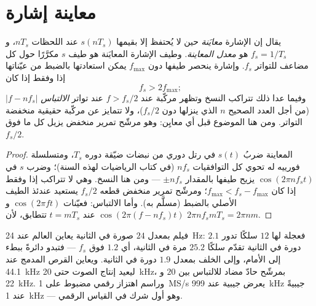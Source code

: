 \section{معاينة إشارة}

\begin{theorem}\label{thm:b2:feedback-oscillators:shannon}
يقال إن الإشارة \emph{معايَنة} حين لا يُحتفظ إلا بقيمها $s(nT_s)$ عند
اللحظات $nT_s$، و $f_s = 1/T_s$ هو \emph{معدل المعاينة}.
وطيف الإشارة المعايَنة هو طيف $s$ مكرَّرًا
حول كل مضاعف للتواتر $f_s$. وإشارة ينحصر طيفها
دون $f_{\max}$ يمكن استعادتها بالضبط من عيّناتها إذا وفقط
إذا كان
\[
f_s > 2f_{\max} ;
\]
وفيما عدا ذلك تتراكب النسخ وتظهر مركّبة عند $f > f_s/2$
عند تواتر \emph{الالتباس} $|f - nf_s|$ (من أجل العدد الصحيح $n$ الذي
ينزلها دون $f_s/2$)، ولا تتمايز عن مركّبة حقيقية منخفضة
التواتر. ومن هنا \emph{} الموضوع قبل أي
معايِن: وهو مرشّح تمرير منخفض يزيل كل ما فوق $f_s/2$.
\end{theorem}

\begin{proof}
المعاينة ضربُ $s(t)$ في رتل دوري من نبضات ضيّقة دوره
$T_s$، ومتسلسلة فورييه له تحوي كل التوافقيات $nf_s$
(في كتاب الرياضيات لهذه السنة)؛ وضرب $s$ في $\cos(2\pi nf_st)$
يزيح طيفها بالمقدار $\pm nf_s$ --- ومن هنا النسخ. وهي لا
تتراكب إذا وفقط إذا كان $f_{\max} < f_s - f_{\max}$؛ ومرشّح تمرير منخفض قطعه $f_s/2$
يستعيد عندئذ الطيف الأصلي بالضبط (مسلَّم به). وأما الالتباس: فعيّنات
$\cos(2\pi ft)$ و $\cos(2\pi(f - nf_s)t)$ عند $t = mT_s$
تتطابق، لأن $2\pi nf_smT_s = 2\pi nm$.
\end{proof}

\begin{example}\label{ex:b2:feedback-oscillators:alias}
فيلم بمعدل $24$ صورة في الثانية يعاين العالم عند \qty{24}{Hz}: فعجلة
لها $12$ سلكًا تدور $2.1$ دورة في الثانية تقدّم سلكًا
$25.2$ مرة في الثانية، أي $1.2$ فوق $f_s$ --- فتبدو دائرةً ببطء
إلى الأمام، وإلى الخلف بمعدل $1.9$ دورة في الثانية. ويعاين القرص المدمج
عند \qty{44.1}{kHz} ليعيد إنتاج الصوت حتى \qty{20}{kHz}، بمرشّح
حادّ مضاد للالتباس بين $20$ و \qty{22}{kHz}. وراسم اهتزاز رقمي
مضبوط على \qty{1}{MS/s} يعرض جيبية عند \qty{999}{kHz} جيبيةً عند \qty{1}{kHz} ---
وهو أول شرك في القياس الرقمي.
\end{example}

